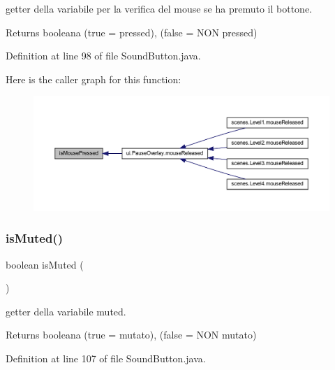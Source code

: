 getter della variabile per la verifica del mouse se ha premuto il bottone. 

\begin{DoxyReturn}{Returns}
booleana (true = pressed), (false = N\+ON pressed) 
\end{DoxyReturn}


Definition at line 98 of file Sound\+Button.\+java.

Here is the caller graph for this function\+:\nopagebreak
\begin{figure}[H]
\begin{center}
\leavevmode
\includegraphics[width=350pt]{classui_1_1_sound_button_ad47389f2ab3067af3626db75a6b3b09e_icgraph}
\end{center}
\end{figure}
\mbox{\label{classui_1_1_sound_button_ab67171d139f4fbb66413cb6c42e83945}} 
\subsubsection{\texorpdfstring{is\+Muted()}{isMuted()}}
{\footnotesize\ttfamily boolean is\+Muted (\begin{DoxyParamCaption}{ }\end{DoxyParamCaption})}



getter della variabile muted. 

\begin{DoxyReturn}{Returns}
booleana (true = mutato), (false = N\+ON mutato) 
\end{DoxyReturn}


Definition at line 107 of file Sound\+Button.\+java.

